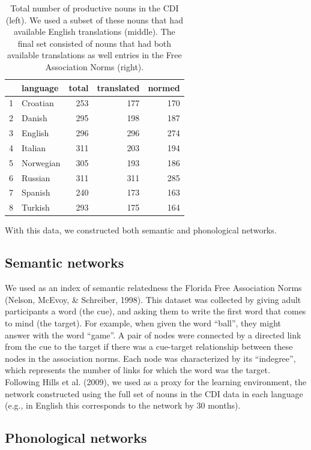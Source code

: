 \documentclass[10pt, letterpaper]{article}
\begin{document}
\begin{table}[H]
\centering
\begin{tabular}{rlrrr}
  \hline
 & language & total & translated & normed \\ 
  \hline
1 & Croatian & 253 & 177 & 170 \\ 
  2 & Danish & 295 & 198 & 187 \\ 
  3 & English & 296 & 296 & 274 \\ 
  4 & Italian & 311 & 203 & 194 \\ 
  5 & Norwegian & 305 & 193 & 186 \\ 
  6 & Russian & 311 & 311 & 285 \\ 
  7 & Spanish & 240 & 173 & 163 \\ 
  8 & Turkish & 293 & 175 & 164 \\ 
   \hline
\end{tabular}
\caption{\label{tab:stats}Total number of productive nouns in the CDI (left). We used a subset of these nouns that had available English translations (middle). The final set consisted of nouns that had both available translations as well entries in the Free Association Norms (right).} 
\end{table}

With this data, we constructed both semantic and phonological networks.

\subsection{Semantic networks}\label{semantic-networks}

We used as an index of semantic relatedness the Florida Free Association
Norms (Nelson, McEvoy, \& Schreiber, 1998). This dataset was collected
by giving adult participants a word (the cue), and asking them to write
the first word that comes to mind (the target). For example, when given
the word ``ball'', they might answer with the word ``game''. A pair of
nodes were connected by a directed link from the cue to the target if
there was a cue-target relationship between these nodes in the
association norms. Each node was characterized by its ``indegree'',
which represents the number of links for which the word was the target.
Following Hills et al. (2009), we used as a proxy for the learning
environment, the network constructed using the full set of nouns in the
CDI data in each language (e.g., in English this corresponds to the
network by 30 months).

\subsection{Phonological networks}\label{phonological-networks}
\end{document}
